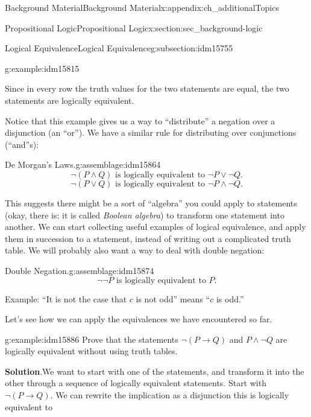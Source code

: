 \documentclass[oneside,10pt,]{book}
\numberwithin{equation}{chapter}
\def\imp{\rightarrow}
\begin{document}
\begin{appendixptx}{Background Material}{}{Background Material}{}{}{x:appendix:ch_additionalTopics}
\begin{sectionptx}{Propositional Logic}{}{Propositional Logic}{}{}{x:section:sec_background-logic}
\begin{subsectionptx}{Logical Equivalence}{}{Logical Equivalence}{}{}{g:subsection:idm15755}
\begin{example}{}{g:example:idm15815}
\begin{sidebyside}{1}{0}{0}{0}
\begin{sbspanel}{1}
{\par}
\end{sbspanel}%
\end{sidebyside}%
\par
Since in every row the truth values for the two statements are equal, the two statements are logically equivalent.%
\end{example}
Notice that this example gives us a way to ``distribute'' a negation over a disjunction (an ``or''). We have a similar rule for distributing over conjunctions (``and''s):%
\begin{assemblage}{De Morgan's Laws.}{g:assemblage:idm15864}%
%
\begin{equation*}
\neg(P \wedge Q) \text{ is logically equivalent to } \neg P \vee \neg Q.
\end{equation*}
%
\begin{equation*}
\neg(P \vee Q) \text{ is logically equivalent to } \neg P \wedge \neg Q.
\end{equation*}
%
\end{assemblage}
This suggests there might be a sort of ``algebra'' you could apply to statements (okay, there is: it is called \emph{Boolean algebra}) to transform one statement into another. We can start collecting useful examples of logical equivalence, and apply them in succession to a statement, instead of writing out a complicated truth table. We will probably also want a way to deal with double negation:%
\begin{assemblage}{Double Negation.}{g:assemblage:idm15874}%
%
\begin{equation*}
\neg \neg P \mbox{ is logically equivalent to } P.
\end{equation*}
%
\par
Example: ``It is not the case that \(c\) is not odd'' means ``\(c\) is odd.''%
\end{assemblage}
Let's see how we can apply the equivalences we have encountered so far.%
\begin{example}{}{g:example:idm15886}%
Prove that the statements \(\neg(P \imp Q)\) and \(P\wedge \neg Q\) are logically equivalent without using truth tables.%
\par\smallskip%
\noindent\textbf{Solution}.\hypertarget{g:solution:idm15891}{}\quad{}We want to start with one of the statements, and transform it into the other through a sequence of logically equivalent statements. Start with \(\neg(P \imp Q)\). We can rewrite the implication as a disjunction this is logically equivalent to%

\end{example}
\end{subsectionptx}
\end{sectionptx}
\end{appendixptx}
\end{document}
